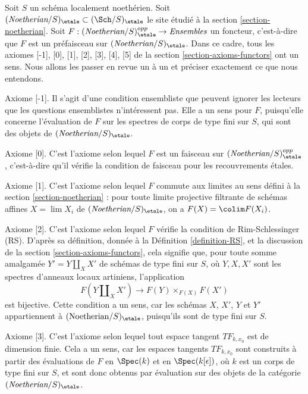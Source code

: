 \noindent
Soit $S$ un schéma localement noethérien. Soit
$(\textit{Noetherian}/S)_\etale \subset (\Sch/S)_\etale$
le site étudié à la section \ref{section-noetherian}.
Soit $F : (\textit{Noetherian}/S)_\etale^{opp} \to \textit{Ensembles}$
un foncteur, c'est-à-dire que $F$ est un préfaisceau sur $(\textit{Noetherian}/S)_\etale$.
Dans ce cadre, tous les axiomes [-1],  [0], [1], [2], [3], [4], [5] de la
section \ref{section-axioms-functors} ont un sens. Nous allons les passer
en revue un à un et préciser exactement ce que nous entendons.

\medskip\noindent
Axiome [-1]. Il s'agit d'une condition ensembliste que peuvent ignorer
les lecteurs que les questions ensemblistes n'intéressent pas.
Elle a un sens pour $F$, puisqu'elle concerne l'évaluation de
$F$ sur les spectres de corps de type fini sur $S$, qui sont
des objets de $(\textit{Noetherian}/S)_\etale$.

\medskip\noindent
Axiome [0]. C'est l'axiome selon lequel $F$ est un faisceau
sur $(\textit{Noetherian}/S)_\etale^{opp}$, c'est-à-dire qu'il vérifie
la condition de faisceau pour les recouvrements \'etales.

\medskip\noindent
Axiome [1]. C'est l'axiome selon lequel $F$ commute aux limites au sens défini
à la section \ref{section-noetherian} : pour toute
limite projective filtrante de schémas affines $X = \lim X_i$ de
$(\textit{Noetherian}/S)_\etale$, on a $F(X) = \colim F(X_i)$.

\medskip\noindent
Axiome [2]. C'est l'axiome selon lequel $F$ vérifie la condition
de Rim-Schlessinger (RS). D'après sa définition, donnée à la
Définition \ref{definition-RS}, et la discussion de la
section \ref{section-axioms-functors},
cela signifie que, pour toute somme amalgamée $Y' = Y \amalg_X X'$
de schémas de type fini sur $S$, où $Y, X, X'$
sont les spectres d'anneaux locaux artiniens, l'application
$$
F(Y \amalg_X X') \to F(Y) \times_{F(X)} F(X')
$$
est bijective. Cette condition a un sens, car les schémas
$X$, $X'$, $Y$ et $Y'$ appartiennent à $(\text{Noetherian}/S)_\etale$,
puisqu'ils sont de type fini sur $S$.

\medskip\noindent
Axiome [3]. C'est l'axiome selon lequel tout espace tangent $TF_{k, x_0}$
est de dimension finie. Cela a un sens, car les espaces tangents $TF_{k, x_0}$
sont construits à partir des évaluations de $F$ en $\Spec(k)$ et
en $\Spec(k[\epsilon])$, où $k$ est un corps de type fini sur $S$,
et sont donc obtenus par évaluation sur des objets de la catégorie
$(\textit{Noetherian}/S)_\etale$.

